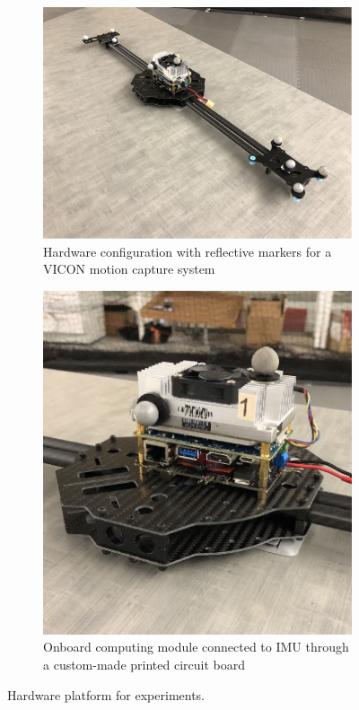 \begin{figure}
	\begin{subfigure}{0.45\textwidth}
		\centering
		\includegraphics[width=\textwidth]{figures/observability/exp1.jpeg}
		\caption{Hardware configuration with reflective markers for a VICON motion capture system}
	\end{subfigure}
	\hspace{0.1\textwidth}
	\begin{subfigure}{0.45\textwidth}
		\centering
		\includegraphics[width=\textwidth]{figures/observability/exp2.jpeg}
		\caption{Onboard computing module connected to IMU through a custom-made printed circuit board}
	\end{subfigure}
	\caption{Hardware platform for experiments.} \label{fig:observability-exp-hardware}
\end{figure}

